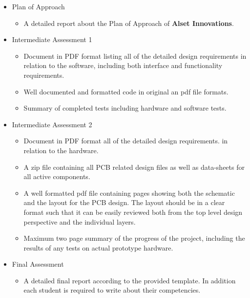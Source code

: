 \begin{itemize}
    \item Plan of Approach
        \begin{itemize}
            \item A detailed report about the Plan of Approach of \textbf{Alset Innovations}.
        \end{itemize}
    \item Intermediate Assessment 1
        \begin{itemize}
            \item Document in PDF format listing all of the detailed design requirements
            in relation to the software, including both interface and functionality
            requirements.
            \item Well documented and formatted code in original an pdf file formats.
            \item Summary of completed tests including hardware and software tests.
        \end{itemize}
    \item Intermediate Assessment 2
        \begin{itemize}
            \item Document in PDF format all of the detailed design requirements.
            in relation to the hardware.
            \item A zip file containing all PCB related design files as well as data-sheets for all active components.
            \item A well formatted pdf file containing pages showing both the schematic
            and the layout for the PCB design. The layout should be in a clear
            format such that it can be easily reviewed both from the top level
            design perspective and the individual layers.
            \item Maximum two page summary of the progress of the project, including
            the results of any tests on actual prototype hardware.
        \end{itemize}
    \item Final Assessment
        \begin{itemize}
            \item A detailed final report according to the provided template. In addition each student is required to write about their competencies.
        \end{itemize}
\end{itemize}